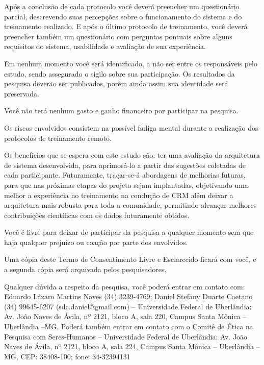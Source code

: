 Após a conclusão de cada protocolo você deverá preencher um questionário parcial, descrevendo suas percepções sobre o funcionamento do sistema e do treinamento realizado. E após o último protocolo de treinamento, você deverá preencher também um questionário com perguntas pontuais sobre alguns requisitos do sistema, usabilidade e avaliação de sua experiência.

Em nenhum momento você será identificado, a não ser entre os responsáveis pelo estudo, sendo assegurado o sigilo sobre sua participação. Os resultados da pesquisa deverão ser publicados, porém ainda assim sua identidade será preservada.

Você não terá nenhum gasto e ganho financeiro por participar na pesquisa.

Os riscos envolvidos consistem na possível fadiga mental durante a realização dos protocolos de treinamento remoto.

Os benefícios que se espera com este estudo são: ter uma avaliação da arquitetura de sistema desenvolvida, para aprimorá-lo a partir das sugestões coletadas de cada participante. Futuramente, traçar-se-á abordagens de melhorias futuras, para que nas próximas etapas do projeto sejam implantadas, objetivando uma melhor a experiência no treinamento na condução de CRM além deixar a arquitetura mais robusta para toda a comunidade, permitindo alcançar melhores contribuições científicas com os dados futuramente obtidos.

Você é livre para deixar de participar da pesquisa a qualquer momento sem que haja qualquer prejuízo ou coação por parte dos envolvidos.

Uma cópia deste Termo de Consentimento Livre e Esclarecido ficará com você, e a segunda cópia será arquivada pelos pesquisadores.

Qualquer dúvida a respeito da pesquisa, você poderá entrar em contato com: Eduardo Lázaro Martins Naves (34) 3239-4769; Daniel Stefany Duarte Caetano (34) 99645-6207 (sdc.daniel@gmail.com) – Universidade Federal de Uberlândia: Av. João Naves de Ávila, nº 2121, bloco A, sala 220, Campus Santa Mônica – Uberlândia –MG. Poderá também entrar em contato com o Comitê de Ética na Pesquisa com Seres-Humanos – Universidade Federal de Uberlândia: Av. João Naves de Ávila, nº 2121, bloco A, sala 224, Campus Santa Mônica – Uberlândia –MG, CEP: 38408-100; fone: 34-32394131


\vspace{\baselineskip}

\vspace{\baselineskip}

